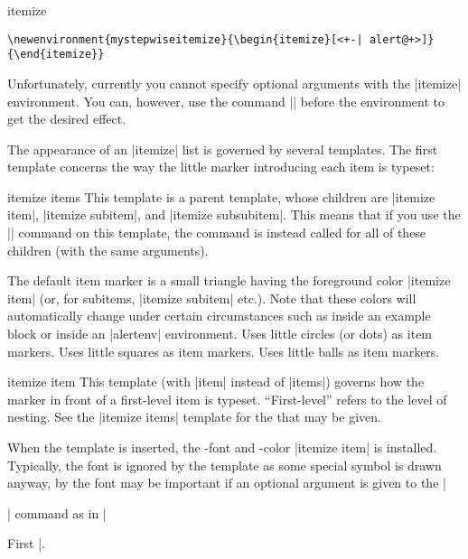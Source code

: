 \begin{environment}{{itemize}}
  \example
\begin{verbatim}
\newenvironment{mystepwiseitemize}{\begin{itemize}[<+-| alert@+>]}{\end{itemize}}
\end{verbatim}

  \lyxnote
  Unfortunately, currently you cannot specify optional arguments with
  the |itemize| environment. You can, however, use the command
  |\beamerdefaultoverlayspecification| before the environment to get
  the desired effect.

  The appearance of an |itemize| list is governed by several
  templates. The first template concerns the way the little marker
  introducing each item is typeset:  
  \begin{element}{itemize items}\semiyes\no\no
    This template is a parent template, whose children are
    |itemize item|, |itemize subitem|, and |itemize subsubitem|. This
    means that if you use the |\setbeamertemplate| command on this
    template, the command is instead called for all of these children
    (with the same arguments). 

    \begin{templateoptions}
      The default item marker is a small triangle having the
      foreground color |itemize item| (or, for subitems, |itemize subitem|
      etc.). Note that these colors will automatically change under
      certain circumstances such as inside an example block or inside
      an |alertenv| environment. 
      Uses little circles (or dots) as item markers. 
      Uses little squares as item markers.
      Uses little balls as item markers.
    \end{templateoptions}
  \end{element}

  \begin{element}{itemize item}\yes\yes\yes
    This template (with |item| instead of |items|) governs how the
    marker in front of a first-level item is typeset. ``First-level''
    refers to the level of nesting. See the |itemize items| template
    for the  that may be given.

    When the template is inserted, the \beamer-font and -color
    |itemize item| is installed. Typically, the font is ignored by the
    template as some special symbol is drawn anyway, by the font may
    be important if an optional argument is given to the
    |\item| command as in |\item[First]|.


\end{element}
\end{environment}
